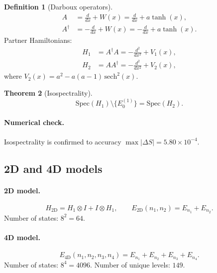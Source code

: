 \documentclass[11pt,a4paper]{article}
\newtheorem{theorem}{Theorem}[section]
\theoremstyle{definition}
\newtheorem{definition}[theorem]{Definition}
\begin{document}
\begin{definition}[Darboux operators]
\label{def:membrane-darboux-review}
\begin{align}
    A &= \frac{d}{dx} + W(x) = \frac{d}{dx} + a \tanh(x), \\
    A^\dagger &= -\frac{d}{dx} + W(x) = -\frac{d}{dx} + a \tanh(x).
\end{align}
Partner Hamiltonians:
\begin{align}
    H_1 &= A^\dagger A = -\frac{d^2}{dx^2} + V_1(x), \\
    H_2 &= A A^\dagger = -\frac{d^2}{dx^2} + V_2(x),
\end{align}
where $V_2(x) = a^2 - a(a-1) \, \mathrm{sech}^2(x)$.
\end{definition}

\begin{theorem}[Isospectrality]
\label{thm:membrane-isospectrality-review}
\begin{equation}
    \boxed{
    \mathrm{Spec}(H_1) \setminus \{E_0^{(1)}\} = \mathrm{Spec}(H_2).
    }
    \label{eq:membrane-isospectrality-review}
\end{equation}
\end{theorem}

\paragraph{Numerical check.}
Isospectrality is confirmed to accuracy 
$\max|\Delta S| = 5.80 \times 10^{-4}$.

\subsection{2D and 4D models}

\paragraph{2D model.}
\begin{equation}
    H_{\text{2D}} = H_1 \otimes I + I \otimes H_1, \qquad
    E_{\text{2D}}(n_1, n_2) = E_{n_1} + E_{n_2}.
\end{equation}
Number of states: $8^2 = 64$.

\paragraph{4D model.}
\begin{equation}
    E_{\text{4D}}(n_1, n_2, n_3, n_4) = E_{n_1} + E_{n_2} + E_{n_3} + E_{n_4}.
\end{equation}
Number of states: $8^4 = 4096$.
Number of unique levels: $149$.
\end{document}
